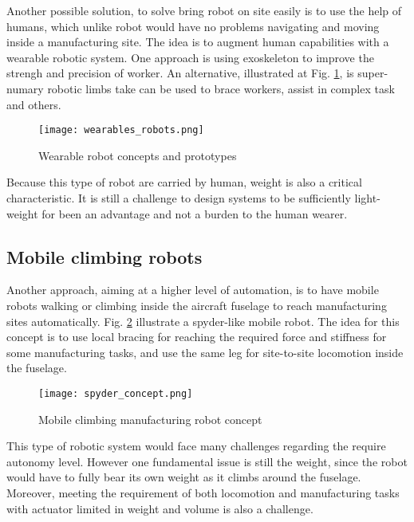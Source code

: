 Another possible solution, to solve bring robot on site easily is to use the help of humans, which unlike robot would have no problems navigating and moving inside a manufacturing site. The idea is to augment human capabilities with a wearable robotic system. One approach is using exoskeleton to improve the strengh and precision of worker. An alternative, illustrated at Fig. \ref{fig:wearable_concept}, is super-numary robotic limbs take can be used to brace workers, assist in complex task and others. 

\begin{figure}[H]
	\centering
		\texttt{[image: wearables\_robots.png]}
		\caption{Wearable robot concepts and prototypes \cite{bonilla_robot_2014} \cite{parietti_supernumerary_2016} \cite{wu_hold-and-manipulate_2015} }
	\label{fig:wearable_concept}
\end{figure}

Because this type of robot are carried by human, weight is also a critical characteristic. It is still a challenge to design systems to be sufficiently light-weight for been an advantage and not a burden to the human wearer.


\subsection{Mobile climbing robots}
\label{sec:MobileClimbingRobots}

Another approach, aiming at a higher level of automation, is to have mobile robots walking or climbing inside the aircraft fuselage to reach manufacturing sites automatically. Fig. \ref{fig:arm_concept} illustrate a spyder-like mobile robot. The idea for this concept is to use local bracing for reaching the required force and stiffness for some manufacturing tasks, and use the same leg for site-to-site locomotion inside the fuselage. 

\begin{figure}[H]
	\centering
		\texttt{[image: spyder\_concept.png]}
		\caption{Mobile climbing manufacturing robot concept}
	\label{fig:arm_concept}
\end{figure}

This type of robotic system would face many challenges regarding the require autonomy level. However one fundamental issue is still the weight, since the robot would have to fully bear its own weight as it climbs around the fuselage. Moreover, meeting the requirement of both locomotion and manufacturing tasks with actuator limited in weight and volume is also a challenge. 


